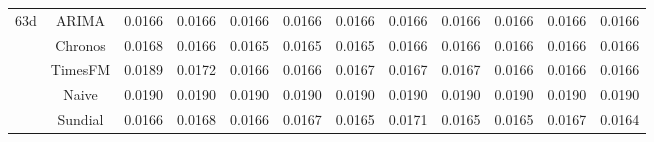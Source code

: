 \begin{table}[H]
{\begin{tabular}{cccccccccccc}
\midrule
\multirow[c]{5}{*}{63d} & ARIMA & 0.0166 & 0.0166 & 0.0166 & 0.0166 & 0.0166 & 0.0166 & 0.0166 & 0.0166 & 0.0166 & 0.0166 \\
 & Chronos & 0.0168 & 0.0166 & 0.0165 & 0.0165 & 0.0165 & 0.0166 & 0.0166 & 0.0166 & 0.0166 & 0.0166 \\
 & TimesFM & 0.0189 & 0.0172 & 0.0166 & 0.0166 & 0.0167 & 0.0167 & 0.0167 & 0.0166 & 0.0166 & 0.0166 \\
 & Naive & 0.0190 & 0.0190 & 0.0190 & 0.0190 & 0.0190 & 0.0190 & 0.0190 & 0.0190 & 0.0190 & 0.0190 \\
 & Sundial & 0.0166 & 0.0168 & 0.0166 & 0.0167 & 0.0165 & 0.0171 & 0.0165 & 0.0165 & 0.0167 & 0.0164 \\
\bottomrule
\end{tabular}

 }
\end{table}